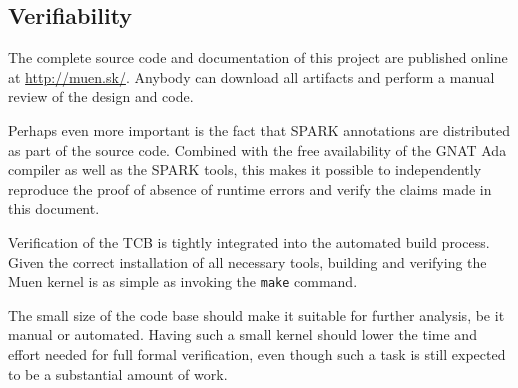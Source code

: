 \subsection{Verifiability}
The complete source code and documentation of this project are published online
at \url{http://muen.sk/}. Anybody can download all artifacts and perform a
manual review of the design and code.

Perhaps even more important is the fact that SPARK annotations are distributed
as part of the source code. Combined with the free availability of the GNAT Ada
compiler as well as the SPARK tools, this makes it possible to independently
reproduce the proof of absence of runtime errors and verify the claims made in
this document.

Verification of the TCB is tightly integrated into the automated build process.
Given the correct installation of all necessary tools, building and verifying
the Muen kernel is as simple as invoking the \texttt{make} command.

The small size of the code base should make it suitable for further analysis, be
it manual or automated. Having such a small kernel should lower the time and
effort needed for full formal verification, even though such a task is still
expected to be a substantial amount of work.
